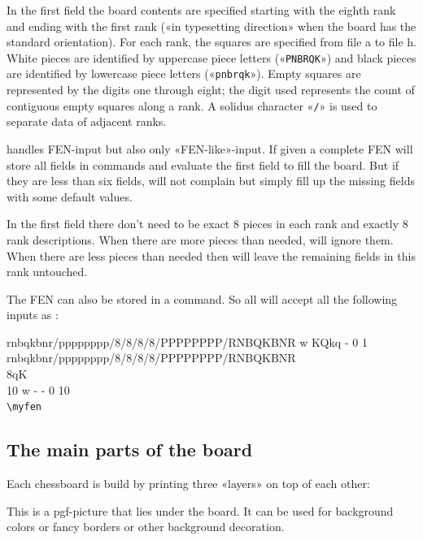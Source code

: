 \documentclass[pagesize,parskip=half-,fontsize=12pt]{scrartcl}
\begin{document}
In the first field the board contents are specified starting with
the eighth rank and ending with the first rank («in typesetting
direction» when the board has the standard orientation). For each
rank, the squares are specified from file a to file h. White pieces
are identified by uppercase piece letters («\texttt{PNBRQK}») and
black pieces are identified by lowercase  piece letters
(«\texttt{pnbrqk}»). Empty squares are represented by the digits one
through eight; the digit used represents the count of contiguous
empty squares along a rank. A solidus character «\texttt{/}» is used
to separate data of adjacent ranks.

 handles FEN-input but also only «FEN-like»-input. If
given a complete FEN  will store all fields in
commands and evaluate the first field to fill the board. But if they
are less than six fields,  will not complain but
simply fill up the missing fields with some default values.

In the first field there don't need to be exact 8 pieces in each rank
and exactly 8 rank descriptions. When there are more pieces than
needed,  will ignore them. When there are less pieces
than needed then  will leave the remaining fields in
this rank untouched.


The FEN can also be stored in a command. So all  will
accept all the following inputs as :

{\ttfamily
 rnbqkbnr/pppppppp/8/8/8/8/PPPPPPPP/RNBQKBNR w KQkq - 0 1\\
 rnbqkbnr/pppppppp/8/8/8/8/PPPPPPPP/RNBQKBNR \\
 8qK\\
 10 w - - 0 10}\\
 \verb+\myfen+

\subsection{The main parts of the board}
Each chessboard is build by printing three «layers» on top of each
other:


This is a pgf-picture that lies under the board. It can be used for
background colors or fancy borders or other background decoration.
\end{document}

